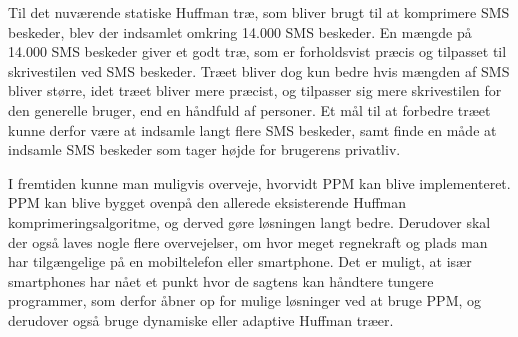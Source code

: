 Til det nuværende statiske Huffman træ, som bliver brugt til at komprimere SMS beskeder, blev der indsamlet omkring 14.000 SMS beskeder. En mængde på 14.000 SMS beskeder giver et godt træ, som er forholdsvist præcis og tilpasset til skrivestilen ved SMS beskeder. Træet bliver dog kun bedre hvis mængden af SMS bliver større, idet træet bliver mere præcist, og tilpasser sig mere skrivestilen for den generelle bruger, end en håndfuld af personer. Et mål til at forbedre træet kunne derfor være at indsamle langt flere SMS beskeder, samt finde en måde at indsamle SMS beskeder som tager højde for brugerens privatliv.
  
I fremtiden kunne man muligvis overveje, hvorvidt PPM kan blive implementeret. PPM kan blive bygget ovenpå den allerede eksisterende Huffman komprimeringsalgoritme, og derved gøre løsningen langt bedre. Derudover skal der også laves nogle flere overvejelser, om hvor meget regnekraft og plads man har tilgængelige på en mobiltelefon eller smartphone. Det er muligt, at især smartphones har nået et punkt hvor de sagtens kan håndtere tungere programmer, som derfor åbner op for mulige løsninger ved at bruge PPM, og derudover også bruge dynamiske eller adaptive Huffman træer.